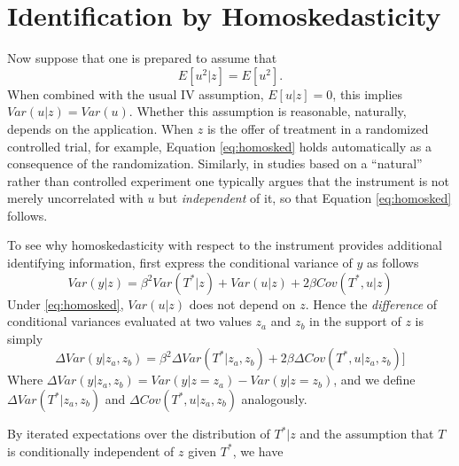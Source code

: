 \section{Identification by Homoskedasticity}

Now suppose that one is prepared to assume that
\begin{equation}
  E[u^2|z]=E[u^2].
  \label{eq:homosked}
\end{equation}
When combined with the usual IV assumption, $E[u|z]=0$, this implies $Var(u|z) = Var(u)$.
Whether this assumption is reasonable, naturally, depends on the application.
When $z$ is the offer of treatment in a randomized controlled trial, for example, Equation \ref{eq:homosked} holds automatically as a consequence of the randomization.
Similarly, in studies based on a ``natural'' rather than controlled experiment one typically argues that the instrument is not merely uncorrelated with $u$ but \emph{independent} of it, so that Equation \ref{eq:homosked} follows.

To see why homoskedasticity with respect to the instrument provides additional identifying information, first express the conditional variance of $y$ as follows
\begin{equation}
 Var(y|z) = \beta^2 Var\left( T^*|z \right) + Var(u|z) + 2\beta Cov(T^*,u|z)
  \label{eq:varyz}
\end{equation}
Under \ref{eq:homosked}, $Var(u|z)$ does not depend on $z$.
Hence the \emph{difference} of conditional variances evaluated at two values $z_a$ and $z_b$ in the support of $z$ is simply
\begin{equation}
  \Delta Var(y|z_a,z_b) = \beta^2\Delta Var(T^*|z_a,z_b) + 2\beta \Delta Cov(T^*,u|z_a, z_b)]
  \label{eq:varydiff}
\end{equation}
Where $\Delta Var(y|z_a,z_b) = Var(y|z = z_a) - Var(y|z = z_b)$, and we define $\Delta Var(T^*|z_a, z_b)$ and $\Delta Cov(T^*,u|z_a,z_b)$ analogously.  

By iterated expectations over the distribution of $T^*|z$ and the assumption that $T$ is conditionally independent of $z$ given $T^*$, we have
